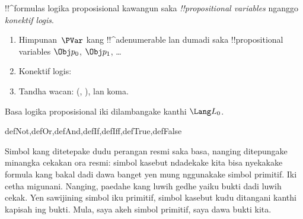\documentclass[../../../include/open-logic-section]{subfiles}
\begin{document}


!!^{formula}s logika proposisional kawangun saka
\emph{!!{propositional
    variable}s} nganggo
  \emph{konektif logis}.

\begin{enumerate}
\item Himpunan~$\PVar$ kang !!^a{denumerable} lan dumadi saka
  !!{propositional variable}s $\Obj p_0$,
  $\Obj p_1$, \dots
{}
\item Konektif logis:
  \startycommalist
\item Tandha wacan: (, ), lan koma.
\end{enumerate}

Basa logika proposisional iki dilambangake kanthi $\Lang L_0$.


\begin{tagblock}{defNot,defOr,defAnd,defIf,defIff,defTrue,defFalse}
\begin{explain}
Simbol kang ditetepake dudu perangan resmi saka basa, nanging
ditepungake minangka cekakan ora resmi: simbol kasebut ndadekake kita bisa
nyekakake formula kang bakal dadi dawa banget yen mung nggunakake
simbol primitif. Iki cetha migunani. Nanging, paedahe kang luwih gedhe
yaiku bukti dadi luwih cekak. Yen sawijining simbol iku primitif, simbol
kasebut kudu ditangani kanthi kapisah ing bukti. Mula, saya
akeh simbol primitif, saya dawa bukti kita.
\end{explain}
\end{tagblock}
\end{document}
